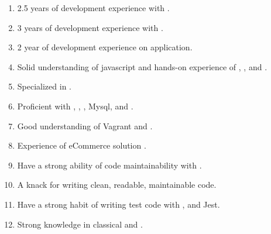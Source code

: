\break
{}
  \begin{enumerate}[leftmargin=4ex, nosep, noitemsep]
    \item 2.5 years of development experience with .
    \item 3 years of development experience with .
    \item 2 year of development experience on  application.
    \item Solid understanding of javascript and hands-on experience of
        , ,  and .
    \item Specialized in .
    \item Proficient with , , , Mysql, and .
    \item Good understanding of Vagrant and .
    \item Experience of eCommerce solution .
    \item Have a strong ability of code maintainability with .
    \item A knack for writing clean, readable, maintainable code.
    \item Have a strong habit of writing test code with ,  and Jest.
    \item Strong knowledge in classical  and .
  \end{enumerate}

